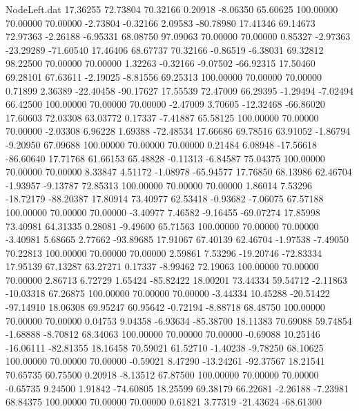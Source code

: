 \begin{filecontents}{NodeLeft.dat}
  17.36255   72.73804   70.32166     0.20918   -8.06350   65.60625  100.00000   70.00000   70.00000   -2.73804   -0.32166    2.09583  -80.78980
  17.41346   69.14673   72.97363    -2.26188   -6.95331   68.08750   97.09063   70.00000   70.00000    0.85327   -2.97363  -23.29289  -71.60540
  17.46406   68.67737   70.32166    -0.86519   -6.38031   69.32812   98.22500   70.00000   70.00000    1.32263   -0.32166   -9.07502  -66.92315
  17.50460   69.28101   67.63611    -2.19025   -8.81556   69.25313  100.00000   70.00000   70.00000    0.71899    2.36389  -22.40458  -90.17627
  17.55539   72.47009   66.29395    -1.29494   -7.02494   66.42500  100.00000   70.00000   70.00000   -2.47009    3.70605  -12.32468  -66.86020
  17.60603   72.03308   63.03772     0.17337   -7.41887   65.58125  100.00000   70.00000   70.00000   -2.03308    6.96228    1.69388  -72.48534
  17.66686   69.78516   63.91052    -1.86794   -9.20950   67.09688  100.00000   70.00000   70.00000    0.21484    6.08948  -17.56618  -86.60640
  17.71768   61.66153   65.48828    -0.11313   -6.84587   75.04375  100.00000   70.00000   70.00000    8.33847    4.51172   -1.08978  -65.94577
  17.76850   68.13986   62.46704    -1.93957   -9.13787   72.85313  100.00000   70.00000   70.00000    1.86014    7.53296  -18.72179  -88.20387
  17.80914   73.40977   62.53418    -0.93682   -7.06075   67.57188  100.00000   70.00000   70.00000   -3.40977    7.46582   -9.16455  -69.07274
  17.85998   73.40981   64.31335     0.28081   -9.49600   65.71563  100.00000   70.00000   70.00000   -3.40981    5.68665    2.77662  -93.89685
  17.91067   67.40139   62.46704    -1.97538   -7.49050   70.22813  100.00000   70.00000   70.00000    2.59861    7.53296  -19.20746  -72.83334
  17.95139   67.13287   63.27271     0.17337   -8.99462   72.19063  100.00000   70.00000   70.00000    2.86713    6.72729    1.65424  -85.82422
  18.00201   73.44334   59.54712    -2.11863  -10.03318   67.26875  100.00000   70.00000   70.00000   -3.44334   10.45288  -20.51422  -97.14910
  18.06308   69.95247   60.95642    -0.72194   -8.88718   68.48750  100.00000   70.00000   70.00000    0.04753    9.04358   -6.93634  -85.38700
  18.11383   70.69088   59.74854    -1.68888   -8.70812   68.34063  100.00000   70.00000   70.00000   -0.69088   10.25146  -16.06111  -82.81355
  18.16458   70.59021   61.52710    -1.40238   -9.78250   68.10625  100.00000   70.00000   70.00000   -0.59021    8.47290  -13.24261  -92.37567
  18.21541   70.65735   60.75500     0.20918   -8.13512   67.87500  100.00000   70.00000   70.00000   -0.65735    9.24500    1.91842  -74.60805
  18.25599   69.38179   66.22681    -2.26188   -7.23981   68.84375  100.00000   70.00000   70.00000    0.61821    3.77319  -21.43624  -68.61300

\end{filecontents}
